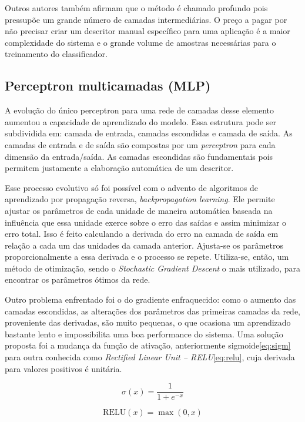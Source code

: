 Outros autores também afirmam que o método é chamado profundo pois pressupõe um grande número de camadas intermediárias. O preço a pagar por não precisar criar um descritor manual específico para uma aplicação é a maior complexidade do sistema e o grande volume de amostras necessárias para o treinamento do classificador.

\subsection{Perceptron multicamadas (MLP)}
A evolução do único perceptron para uma rede de camadas desse elemento aumentou a capacidade de aprendizado do modelo. Essa estrutura pode ser subdividida em: camada de entrada, camadas escondidas e camada de saída. As camadas de entrada e de saída são compostas por um \textit{perceptron} para cada dimensão da entrada/saída. As camadas escondidas são fundamentais pois permitem justamente a elaboração automática de um descritor.

Esse processo evolutivo só foi possível com o advento de algoritmos de aprendizado por propagação reversa, \textit{backpropagation learning}. Ele  permite ajustar os parâmetros de cada unidade de maneira automática baseada na influência que essa unidade exerce sobre o erro das saídas e assim minimizar o erro total. Isso é feito calculando a derivada do erro na camada de saída em relação a cada um das unidades da camada anterior. Ajusta-se os parâmetros proporcionalmente a essa derivada e o processo se repete. Utiliza-se, então, um método de otimização, sendo o \textit{Stochastic Gradient Descent} o mais utilizado, para encontrar os parâmetros ótimos da rede.

Outro problema enfrentado foi o do gradiente enfraquecido: como o aumento das camadas escondidas, as alterações dos parâmetros das primeiras camadas da rede, proveniente das derivadas, são muito pequenas, o que ocasiona um aprendizado bastante lento e impossibilita uma boa performance do sistema. Uma solução proposta foi a mudança da função de ativação, anteriormente sigmoide\ref{eq:sigm} para outra conhecida como \textit{Rectified Linear Unit -- RELU}\ref{eq:relu}, cuja derivada para valores positivos é unitária. 

\begin{equation}
	\label{eq:sigm}
	\sigma(x) = \frac{1}{1+e^{-x}}
\end{equation}

\begin{equation}
	\label{eq:relu}
	\text{RELU}(x) = \max(0,x)
\end{equation}

